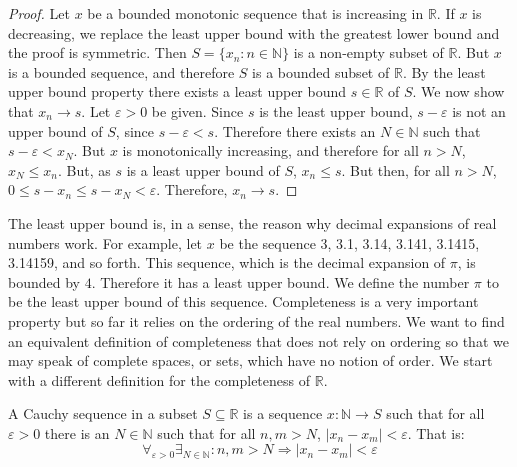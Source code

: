 \documentclass[crop=false,class=book,oneside]{standalone}
\begin{document}
            \begin{proof}
                Let $x$ be a bounded monotonic sequence that
                is increasing in $\mathbb{R}$.
                If $x$ is decreasing, we replace the least
                upper bound with the greatest lower
                bound and the proof is symmetric.
                Then $S=\{x_{n}:n\in\mathbb{N}\}$ is a
                non-empty subset of $\mathbb{R}$. But $x$ is
                a bounded sequence, and therefore $S$ is a
                bounded subset of $\mathbb{R}$. By the least
                upper bound property there exists a least
                upper bound $s\in\mathbb{R}$ of $S$.
                We now show that $x_{n}\rightarrow{s}$.
                Let $\varepsilon>0$ be given. Since $s$ is
                the least upper bound, $s-\varepsilon$
                is not an upper bound of $S$, since
                $s-\varepsilon<s$. Therefore there exists
                an $N\in\mathbb{N}$ such that
                $s-\varepsilon<x_{N}$. But $x$ is
                monotonically increasing, and therefore
                for all $n>N$, $x_{N}\leq{x_{n}}$.
                But, as $s$ is a least upper
                bound of $S$, $x_{n}\leq{s}$. But then,
                for all $n>N$,
                $0\leq{s-x_{n}}\leq{s-x_{N}}<\varepsilon$.
                Therefore, $x_{n}\rightarrow{s}$.
            \end{proof}
            The least upper bound is, in a sense, the
            reason why decimal expansions of
            real numbers work. For example, let $x$ be the
            sequence 3, 3.1, 3.14, 3.141, 3.1415, 3.14159,
            and so forth. This sequence, which is
            the decimal expansion of $\pi$, is bounded by $4$.
            Therefore it has a least upper bound.
            We define the number $\pi$
            to be the least upper bound of this sequence.
            Completeness is a very important property
            but so far it relies on the ordering
            of the real numbers.
            We want to find an equivalent definition
            of completeness that does not rely on ordering
            so that we may speak of complete spaces,
            or sets, which have no notion of
            order. We start with a different definition
            for the completeness of $\mathbb{R}$.
            \begin{definition}
                A Cauchy sequence in a subset
                $S\subseteq\mathbb{R}$ is a
                sequence $x:\mathbb{N}\rightarrow{S}$
                such that for all $\varepsilon>0$ there
                is an $N\in\mathbb{N}$ such that for all
                $n,m>N$, $|x_{n}-x_{m}|<\varepsilon$.
                That is:
                \begin{equation}
                    \label{thm:Func_Def_Cauchy_Sequence}
                    \forall_{\varepsilon>0}
                    \exists_{N\in\mathbb{N}}:
                    n,m>N\Rightarrow
                    |x_{n}-x_{m}|<\varepsilon
                \end{equation}
            \end{definition}
\end{document}
